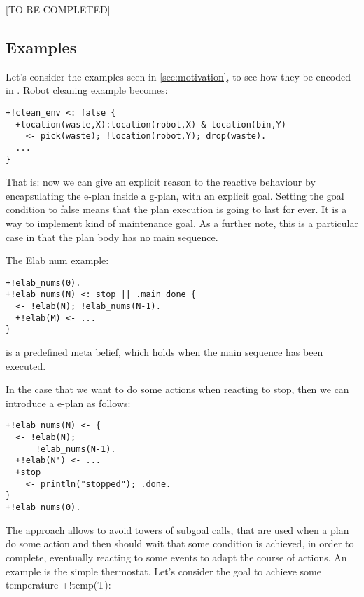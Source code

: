 
[TO BE COMPLETED]

\subsection{Examples}

Let's consider  the examples seen in {\ref{sec:motivation}},  to see how they be encoded in {\aser}. 
%
Robot cleaning example becomes:

\begin{small}
\begin{verbatim}
+!clean_env <: false {
  +location(waste,X):location(robot,X) & location(bin,Y)
    <- pick(waste); !location(robot,Y); drop(waste).
  ...
}
\end{verbatim}
\end{small}

\noindent That is: now we can give an explicit reason to the reactive behaviour by encapsulating the e-plan inside a g-plan, with an explicit goal.
%
Setting the goal condition to false means that  the plan execution is going to last for ever. It is a way to implement kind of maintenance goal.
%
As a further note, this is a particular case in that the plan body has no main sequence.
%

The Elab num example:

{\small
\begin{verbatim}
+!elab_nums(0).
+!elab_nums(N) <: stop || .main_done {
  <- !elab(N); !elab_nums(N-1).	
  +!elab(M) <- ...
}
\end{verbatim}}

%
 is a predefined meta belief, which holds when the main sequence has been executed. 

In the case that we want to do some actions when reacting to stop, then we can introduce a e-plan as follows:

{\small
\begin{verbatim}
+!elab_nums(N) <- {
  <- !elab(N);
      !elab_nums(N-1).
  +!elab(N') <- ...
  +stop 
    <- println("stopped"); .done.		
}
+!elab_nums(0).
\end{verbatim}}

\noindent  The approach allows to avoid towers of subgoal calls, that are used when a plan do some action and then should wait that some condition is achieved, in order to complete, eventually reacting to some events to adapt the course of actions. 
%
An example is the simple thermostat. 
%
Let's consider the goal to achieve some temperature +!temp(T):


